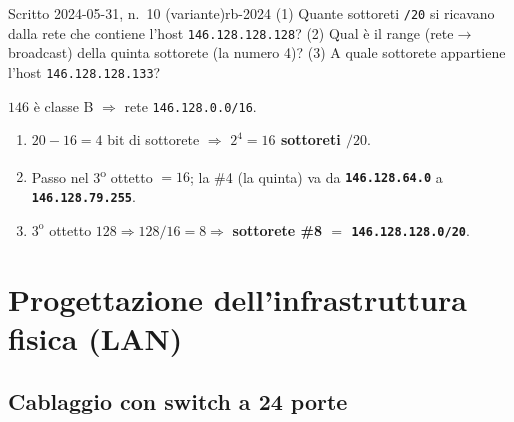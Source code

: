 \documentclass{report}
\begin{document}
\begin{Exercise}{Scritto 2024-05-31, n.\ 10 (variante)}{rb-2024}
(1) Quante sottoreti \texttt{/20} si ricavano dalla rete che contiene l'host
\texttt{146.128.128.128}?
(2) Qual è il range (rete$\to$broadcast) della quinta sottorete (la numero 4)?
(3) A quale sottorete appartiene l'host \texttt{146.128.128.133}?
\end{Exercise}

\begin{solution}
$146$ è classe B $\Rightarrow$ rete \texttt{146.128.0.0/16}.
\begin{enumerate}
\item $20-16=4$ bit di sottorete $\Rightarrow$ \textbf{$2^4=16$ sottoreti $/20$}.
\item Passo nel 3\textsuperscript{o} ottetto $=16$; la \#4 (la quinta) va da
\textbf{\texttt{146.128.64.0}} a \textbf{\texttt{146.128.79.255}}.
\item $3^{\text{o}}$ ottetto $128 \Rightarrow 128/16=8 \Rightarrow$
\textbf{sottorete \#8 $=$ \texttt{146.128.128.0/20}}.
\end{enumerate}
\end{solution}



\chapter{Progettazione dell'infrastruttura fisica (LAN)}

\section{Cablaggio con switch a 24 porte}
\end{document}
